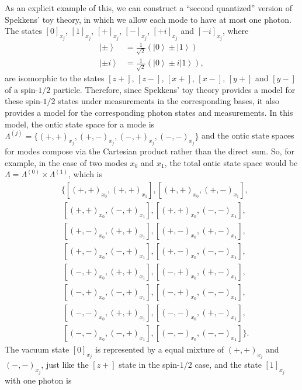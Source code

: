 \documentclass[DIV=calc,fontsize=12pt]{scrartcl} %
\theoremstyle{definition}
\theoremstyle{plain}
\newcommand{\Ket}[1]{\ensuremath{\left \vert #1 \right \rangle}}
\newcommand{\Proj}[1]{\ensuremath{\left [ #1 \right ]}}
\begin{document}
As an explicit example of this, we can construct a ``second
quantized'' version of Spekkens' toy theory, in which we allow each
mode to have at most one photon.  The states $\Proj{0}_{x_j}$,
$\Proj{1}_{x_j}$, $\Proj{+}_{x_j}$, $\Proj{-}_{x_j}$,
$\Proj{+i}_{x_j}$ and $\Proj{-i}_{x_j}$, where
\begin{align}
\Ket{\pm} & = \frac{1}{\sqrt{2}} \left (\Ket{0} \pm \Ket{1} \right ) \\
\Ket{\pm i} & = \frac{1}{\sqrt{2}} \left (\Ket{0} \pm i\Ket{1} \right ),
\end{align}
are isomorphic to the states $\Proj{z+}$, $\Proj{z-}$, $\Proj{x+}$,
$\Proj{x-}$, $\Proj{y+}$ and $\Proj{y-}$ of a spin-$1/2$ particle.
Therefore, since Spekkens' toy theory provides a model for these
spin-$1/2$ states under measurements in the corresponding bases, it
also provides a model for the corresponding photon states and
measurements.  In this model, the ontic state space for a mode is
$\Lambda^{(j)} = \{(+,+)_{x_j},(+,-)_{x_j},(-,+)_{x_j},(-,-)_{x_j}\}$
and the ontic state spaces for modes compose via the Cartesian product
rather than the direct sum.  So, for example, in the case of two modes
$x_0$ and $x_1$, the total ontic state space would be $\Lambda =
\Lambda^{(0)} \times \Lambda^{(1)}$, which is
\begin{eqnarray}
&\{\left[(+,+)_{x_0},(+,+)_{x_1}\right], \left[(+,+)_{x_0},(+,-)_{x_1}\right],\nonumber\\
&~\left[(+,+)_{x_0},(-,+)_{x_1}\right], \left[(+,+)_{x_0},(-,-)_{x_1}\right], \nonumber\\
&~\left[(+,-)_{x_0},(+,+)_{x_1}\right], \left[(+,-)_{x_0},(+,-)_{x_1}\right],\nonumber\\
&~\left[(+,-)_{x_0},(-,+)_{x_1}\right],\left[(+,-)_{x_0},(-,-)_{x_1}\right],\nonumber\\
&~\left[(-,+)_{x_0},(+,+)_{x_1}\right], \left[(-,+)_{x_0},(+,-)_{x_1}\right],\nonumber\\
&~\left[(-,+)_{x_0},(-,+)_{x_1}\right],\left[(-,+)_{x_0},(-,-)_{x_1}\right],\nonumber\\
&~\left[(-,-)_{x_0},(+,+)_{x_1}\right],\left[(-,-)_{x_0},(+,-)_{x_1}\right],\nonumber\\
&~\left[(-,-)_{x_0},(-,+)_{x_1}\right],\left[(-,-)_{x_0},(-,-)_{x_1}\right] \}.
\end{eqnarray}
The vacuum state $\Proj{0}_{x_j}$ is represented by a equal mixture of
$(+,+)_{x_j}$ and $(-,-)_{x_j}$, just like the $\Proj{z+}$ state in
the spin-$1/2$ case, and the state $\Proj{1}_{x_j}$ with one photon is
\end{document}
